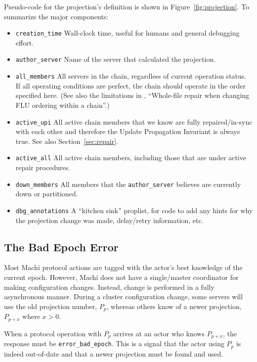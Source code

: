 \documentclass[preprint,10pt]{sigplanconf}
\begin{document}
Pseudo-code for the projection's definition is shown in
Figure~\ref{fig:projection}.  To summarize the major components:

\begin{itemize}
\item {\tt creation\_time} Wall-clock time, useful for humans and
  general debugging effort.
\item {\tt author\_server} Name of the server that calculated the projection.
\item {\tt all\_members} All servers in the chain, regardless of current
  operation status.  If all operating conditions are perfect, the
  chain should operate in the order specified here.
  (See also the limitations in \cite{machi-chain-manager-design},
  ``Whole-file repair when changing FLU ordering within a chain''.)
\item {\tt active\_upi} All active chain members that we know are
  fully repaired/in-sync with each other and therefore the Update
  Propagation Invariant \cite{machi-chain-manager-design} is always true.
  See also Section~\ref{sec:repair}.
\item {\tt active\_all} All active chain members, including those that
  are under active repair procedures.
\item {\tt down\_members} All members that the {\tt author\_server}
  believes are currently down or partitioned.
\item {\tt dbg\_annotations} A ``kitchen sink'' proplist, for code to
  add any hints for why the projection change was made, delay/retry
  information, etc.
\end{itemize}

\subsection{The Bad Epoch Error}
\label{sub:bad-epoch}

Most Machi protocol actions are tagged with the actor's best knowledge
of the current epoch.  However, Machi does not have a single/master
coordinator for making configuration changes.  Instead, change is
performed in a fully asynchronous manner.  During a cluster
configuration change, some servers will use the old projection number,
$P_p$, whereas others know of a newer projection, $P_{p+x}$ where $x>0$.

When a protocol operation with $P_p$ arrives at an actor who knows
$P_{p+x}$, the response must be {\tt error\_bad\_epoch}.  This is a signal
that the actor using $P_p$ is indeed out-of-date and that a newer
projection must be found and used.
\end{document}
